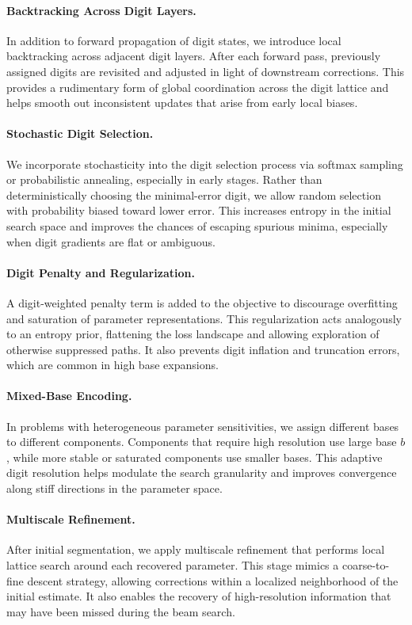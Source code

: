 \documentclass[aps,twocolumn,superscriptaddress,nofootinbib]{revtex4}
\begin{document}
\paragraph{Backtracking Across Digit Layers.} In addition to forward propagation of digit states, we introduce local backtracking across adjacent digit layers. After each forward pass, previously assigned digits are revisited and adjusted in light of downstream corrections. This provides a rudimentary form of global coordination across the digit lattice and helps smooth out inconsistent updates that arise from early local biases.

\paragraph{Stochastic Digit Selection.} We incorporate stochasticity into the digit selection process via softmax sampling or probabilistic annealing, especially in early stages. Rather than deterministically choosing the minimal-error digit, we allow random selection with probability biased toward lower error. This increases entropy in the initial search space and improves the chances of escaping spurious minima, especially when digit gradients are flat or ambiguous.

\paragraph{Digit Penalty and Regularization.} A digit-weighted penalty term is added to the objective to discourage overfitting and saturation of parameter representations. This regularization acts analogously to an entropy prior, flattening the loss landscape and allowing exploration of otherwise suppressed paths. It also prevents digit inflation and truncation errors, which are common in high base expansions.

\paragraph{Mixed-Base Encoding.} In problems with heterogeneous parameter sensitivities, we assign different bases to different components. Components that require high resolution use large base \( b \), while more stable or saturated components use smaller bases. This adaptive digit resolution helps modulate the search granularity and improves convergence along stiff directions in the parameter space.

\paragraph{Multiscale Refinement.} After initial segmentation, we apply multiscale refinement that performs local lattice search around each recovered parameter. This stage mimics a coarse-to-fine descent strategy, allowing corrections within a localized neighborhood of the initial estimate. It also enables the recovery of high-resolution information that may have been missed during the beam search.
\end{document}
